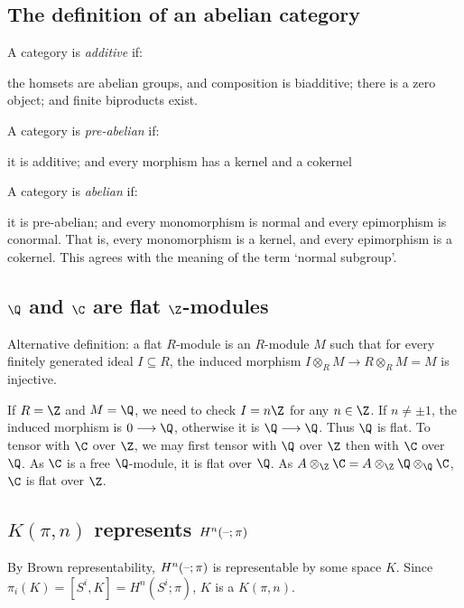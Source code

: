 \documentclass[11pt]{article}
\newcommand{\myheading}[1]
{{\noindent\Large #1}

}
\renewcommand{\myheading}[1]{\subsection{#1}}
\begin{document}
\begin{abelian categories}
\myheading{The definition of an abelian category}
\noindent A category is \emph{additive} if:
\begin{itemise}
\itm the homsets are abelian groups, and composition is biadditive;
\itm there is a zero object; and
\itm finite biproducts exist.
\end{itemise}
A category is \emph{pre-abelian} if:
\begin{itemise}
\itm it is additive; and
\itm every morphism has a kernel and a cokernel
\end{itemise}
A category is \emph{abelian} if:
\begin{itemise}
\itm it is pre-abelian; and
\itm every monomorphism is normal and every epimorphism is conormal. That is,
every monomorphism is a kernel, and every epimorphism is a cokernel. This agrees
with the meaning of the term `normal subgroup'.
\end{itemise}
\end{abelian categories}
\begin{Q and C are flat}
\myheading{\texorpdfstring{$\Q$ and $\C$ are flat $\Z$-modules}%
{Q and C are flat Z-modules}}
Alternative definition: a flat $R$-module is an $R$-module $M$ such that for
every finitely generated ideal $I\subseteq R$, the induced morphism $I\otimes_R
M\to R\otimes_R M=M$ is injective.

If $R=\Z$ and $M=\Q$, we need to check $I=n\Z$ for any $n\in\Z$. If $n\neq\pm1$,
the induced morphism is $0\to\Q$, otherwise it is $\Q\to\Q$. Thus $\Q$ is flat.
To tensor with $\C$ over $\Z$, we may first tensor with $\Q$ over $\Z$ then with
$\C$ over $\Q$. As $\C$ is a free $\Q$-module, it is flat over $\Q$. As 
$A\otimes_{\Z} \C=A\otimes_{\Z}\Q\otimes_{\Q}\C$, $\C$ is flat over $\Z$.

\end{Q and C are flat}
\begin{Cohomology is representable}
\myheading{\texorpdfstring{$K(\pi,n)$ represents $H^n(\textup{--};\pi)$}%
{Eilenberg-MacLane spaces represent ordinary cohomology}}
By Brown representability, $H^n(\textup{--};\pi)$ is representable by some space $K$.
Since $\pi_i(K)=[S^i,K]=H^n(S^i;\pi)$, $K$ is a $K(\pi,n)$.
\end{Cohomology is representable}
\end{document}

